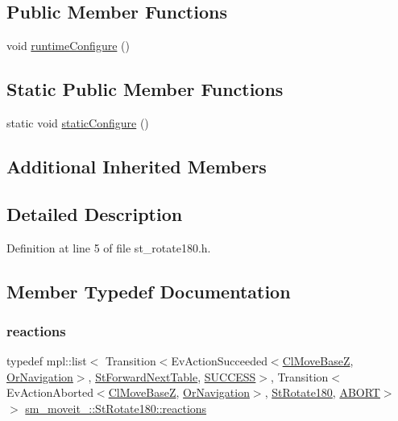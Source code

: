 \subsection*{Public Member Functions}
\begin{DoxyCompactItemize}
\item 
void \hyperlink{structsm__moveit__2_1_1StRotate180_a4c99c3cc7db072a3280fc7cd02e09f99}{runtime\+Configure} ()
\end{DoxyCompactItemize}
\subsection*{Static Public Member Functions}
\begin{DoxyCompactItemize}
\item 
static void \hyperlink{structsm__moveit__2_1_1StRotate180_a2a2ba9d303c075ca5a6997c27194616b}{static\+Configure} ()
\end{DoxyCompactItemize}
\subsection*{Additional Inherited Members}


\subsection{Detailed Description}


Definition at line 5 of file st\+\_\+rotate180.\+h.



\subsection{Member Typedef Documentation}
\mbox{\label{structsm__moveit__2_1_1StRotate180_ac1a99ab8b546643d3cdc429fba88390a}} 
\subsubsection{\texorpdfstring{reactions}{reactions}}
{\footnotesize\ttfamily typedef mpl\+::list$<$ Transition$<$Ev\+Action\+Succeeded$<$\hyperlink{classcl__move__base__z_1_1ClMoveBaseZ}{Cl\+Move\+BaseZ}, \hyperlink{classsm__moveit__2_1_1OrNavigation}{Or\+Navigation}$>$, \hyperlink{structsm__moveit__2_1_1StForwardNextTable}{St\+Forward\+Next\+Table}, \hyperlink{classSUCCESS}{S\+U\+C\+C\+E\+SS}$>$, Transition$<$Ev\+Action\+Aborted$<$\hyperlink{classcl__move__base__z_1_1ClMoveBaseZ}{Cl\+Move\+BaseZ}, \hyperlink{classsm__moveit__2_1_1OrNavigation}{Or\+Navigation}$>$, \hyperlink{structsm__moveit__2_1_1StRotate180}{St\+Rotate180}, \hyperlink{classABORT}{A\+B\+O\+RT}$>$ $>$ \hyperlink{structsm__moveit__2_1_1StRotate180_ac1a99ab8b546643d3cdc429fba88390a}{sm\+\_\+moveit\+\_\+::\+St\+Rotate180\+::reactions}}



